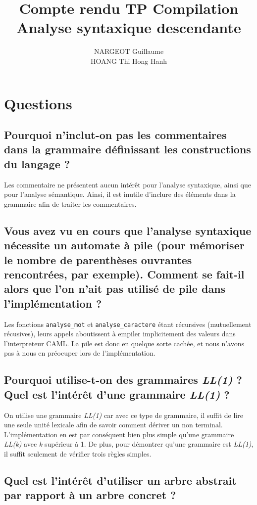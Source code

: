 \documentclass[a4paper,11pt]{article}
\title{Compte rendu TP Compilation \no 3\\Analyse syntaxique descendante}
\author{NARGEOT Guillaume\\HOANG Thi Hong Hanh}
\begin{document}
\maketitle

\section{Questions}

\subsection{Pourquoi n'inclut-on pas les commentaires dans la grammaire d\'efinissant les constructions du langage ?}

Les commentaire ne pr\'esentent aucun int\'er\^et pour l'analyse syntaxique,
ainsi que pour l'analyse s\'emantique.
Ainsi, il est inutile d'inclure des \'el\'ements dans la grammaire afin de traiter les commentaires.

\subsection{Vous avez vu en cours que l'analyse syntaxique n\'ecessite un automate \`a pile (pour m\'emoriser le nombre de parenth\`eses 
ouvrantes rencontr\'ees, par exemple). Comment se fait-il alors que l'on n'ait pas utilis\'e de pile dans l'impl\'ementation ?}
Les fonctions \verb+analyse_mot+ et \verb+analyse_caractere+ \'etant r\'ecursives (mutuellement r\'ecusives), leurs appels aboutissent \`a empiler implicitement des valeurs dans l'interpreteur CAML. La pile est donc en quelque sorte cach\'ee, et nous n'avons pas \`a nous en pr\'eocuper lors de l'impl\'ementation.

\subsection{Pourquoi utilise-t-on des grammaires \emph{LL(1)} ? Quel est l'int\'er\^et d'une grammaire \emph{LL(1)} ?}

On utilise une grammaire \emph{LL(1)} car avec ce type de grammaire, il suffit de lire une seule unit\'e lexicale afin de savoir comment d\'eriver un non terminal. L'impl\'ementation en est par cons\'equent bien plus simple qu'une grammaire \emph{LL(k)} avec \emph{k} sup\'erieur \`a 1.
De plus, pour d\'emontrer qu'une grammaire est \emph{LL(1)}, il suffit seulement de v\'erifier trois r\`egles simples.

\subsection{Quel est l'int\'er\^et d'utiliser un arbre abstrait par rapport \`a un arbre concret ?}
\end{document}

